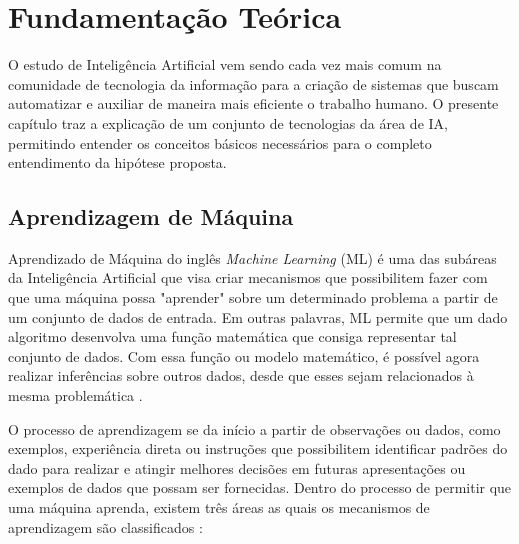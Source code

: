 \chapter[Fundamentação Teórica]{Fundamentação Teórica}

O estudo de Inteligência Artificial vem sendo cada vez mais comum na comunidade de tecnologia da informação para a criação de sistemas que buscam automatizar e auxiliar de maneira mais eficiente o trabalho humano. O presente capítulo traz a explicação de um conjunto de tecnologias da área de IA, permitindo entender os conceitos básicos necessários para o completo entendimento da hipótese proposta.

\section{Aprendizagem de Máquina}

Aprendizado de Máquina do inglês \textit{Machine Learning} (ML) é uma das subáreas da Inteligência Artificial que visa criar mecanismos que possibilitem fazer com que uma máquina possa "aprender" sobre um determinado problema a partir de um conjunto de dados de entrada. Em outras palavras, ML permite que um dado algoritmo desenvolva uma função matemática que consiga representar tal conjunto de dados. Com essa função ou modelo matemático, é possível agora realizar inferências sobre outros dados, desde que esses sejam relacionados à mesma problemática \cite{deep-learning-book-br}.

O processo de aprendizagem se da início a partir de observações ou dados, como exemplos, experiência direta ou instruções que possibilitem identificar padrões do dado para realizar e atingir melhores decisões em futuras apresentações ou exemplos de dados que possam ser fornecidas. Dentro do processo de permitir que uma máquina aprenda, existem três áreas as quais os mecanismos de aprendizagem são classificados \cite{python-ml}:

